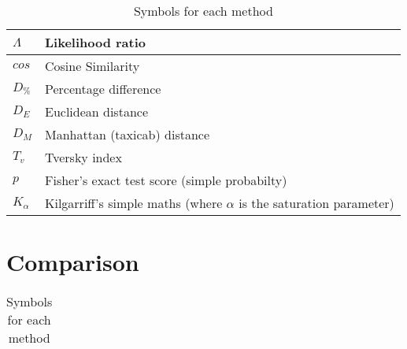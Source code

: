 \documentclass[11pt]{article}
\begin{document}
\begin{table}[h]
\begin{tabular}{|l|l|}
$\Lambda$           & Likelihood ratio\\ \hline
$cos$               & Cosine Similarity\\ \hline
$D_\%$              & Percentage difference \\ \hline
$D_E$               & Euclidean distance\\ \hline
$D_M$               & Manhattan (taxicab) distance\\ \hline
$T_v$               & Tversky index\\ \hline
$p$                 & Fisher's exact test score (simple probabilty)\\ \hline
$K_{\alpha}$        & Kilgarriff's simple maths (where $\alpha$ is the saturation parameter)\\ \hline
\end{tabular}
\caption{Symbols for each method}
\label{tab:symbols}
\end{table}



\section{Comparison}
\begin{landscape}
\begin{table}[h]
\centering
\begin{tabular}{|l|l|}
\hline


\end{tabular}
\caption{Symbols for each method}
\label{tab:symbols}
\end{table}

\end{landscape}








\end{document}
